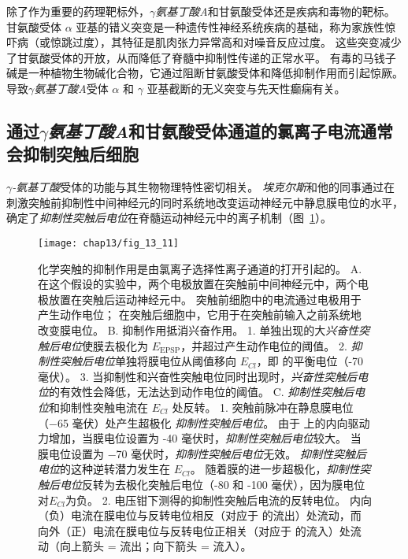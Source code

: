 除了作为重要的药理靶标外，\textit{$\gamma$氨基丁酸A}和甘氨酸受体还是疾病和毒物的靶标。
甘氨酸受体 $\alpha$ 亚基的错义突变是一种遗传性神经系统疾病的基础，称为家族性惊吓病（或惊跳过度），其特征是肌肉张力异常高和对噪音反应过度。
这些突变减少了甘氨酸受体的开放，从而降低了脊髓中抑制性传递的正常水平。
有毒的马钱子碱是一种植物生物碱化合物，它通过阻断甘氨酸受体和降低抑制作用而引起惊厥。
导致\textit{$\gamma$氨基丁酸A}受体 $\alpha$ 和 $\gamma$ 亚基截断的无义突变与先天性癫痫有关。



\subsection{通过\textit{$\gamma$氨基丁酸A}和甘氨酸受体通道的氯离子电流通常会抑制突触后细胞}

\textit{$\gamma$-氨基丁酸}受体的功能与其生物物理特性密切相关。
\textit{埃克尔斯}和他的同事通过在刺激突触前抑制性中间神经元的同时系统地改变运动神经元中静息膜电位的水平，确定了\textit{抑制性突触后电位}在脊髓运动神经元中的离子机制（图~\ref{fig:13_11}）。


\begin{figure}[htbp]
	\centering
	\texttt{[image: chap13/fig\_13\_11]}
	\caption{化学突触的抑制作用是由氯离子选择性离子通道的打开引起的。
		A. 在这个假设的实验中，两个电极放置在突触前中间神经元中，两个电极放置在突触后运动神经元中。
		突触前细胞中的电流通过电极用于产生动作电位；
		在突触后细胞中，它用于在突触前输入之前系统地改变膜电位。
		B. 抑制作用抵消兴奋作用。
		1. 单独出现的大\textit{兴奋性突触后电位}使膜去极化为 $E_{\text{EPSP}}$，并超过产生动作电位的阈值。
		2. \textit{抑制性突触后电位}单独将膜电位从阈值移向 $E_{Cl}$，即  的平衡电位（-70 毫伏）。
		3. 当抑制性和兴奋性突触电位同时出现时，\textit{兴奋性突触后电位}的有效性会降低，无法达到动作电位的阈值。
		C. \textit{抑制性突触后电位}和抑制性突触电流在 $E_{Cl}$ 处反转。
		1. 突触前脉冲在静息膜电位（−65 毫伏）处产生超极化 \textit{抑制性突触后电位}。
		由于  上的内向驱动力增加，当膜电位设置为 -40 毫伏时，\textit{抑制性突触后电位}较大。
		当膜电位设置为 −70 毫伏时，\textit{抑制性突触后电位}无效。
		\textit{抑制性突触后电位}的这种逆转潜力发生在 $E_{Cl}$。
		随着膜的进一步超极化，\textit{抑制性突触后电位}反转为去极化突触后电位（-80 和 -100 毫伏），因为膜电位对$E_{Cl}$为负。
		2. 电压钳下测得的抑制性突触后电流的反转电位。
		内向（负）电流在膜电位与反转电位相反（对应于  的流出）处流动，而向外（正）电流在膜电位与反转电位正相关（对应于  的流入）处流动（向上箭头 = 流出；向下箭头 = 流入）。}
	\label{fig:13_11}
\end{figure}



